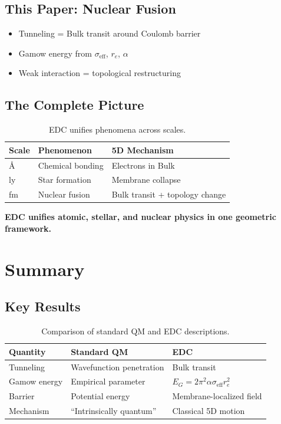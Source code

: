 \documentclass[12pt,a4paper]{article}
\begin{document}
\subsection{This Paper: Nuclear Fusion}
\begin{itemize}
    \item Tunneling = Bulk transit around Coulomb barrier
    \item Gamow energy from $\sigma_{\text{eff}}$, $r_e$, $\alpha$
    \item Weak interaction = topological restructuring
\end{itemize}

\subsection{The Complete Picture}

\begin{table}[H]
\centering
\begin{tabular}{@{}lll@{}}
\toprule
\textbf{Scale} & \textbf{Phenomenon} & \textbf{5D Mechanism} \\
\midrule
Å & Chemical bonding & Electrons in Bulk \\
ly & Star formation & Membrane collapse \\
fm & Nuclear fusion & Bulk transit + topology change \\
\bottomrule
\end{tabular}
\caption{EDC unifies phenomena across scales.}
\end{table}

\begin{keyresult}
\textbf{EDC unifies atomic, stellar, and nuclear physics in one geometric framework.}
\end{keyresult}

\section{Summary}

\subsection{Key Results}

\begin{table}[H]
\centering
\begin{tabular}{@{}lll@{}}
\toprule
\textbf{Quantity} & \textbf{Standard QM} & \textbf{EDC} \\
\midrule
Tunneling & Wavefunction penetration & Bulk transit \\
Gamow energy & Empirical parameter & $E_G = 2\pi^2\alpha\sigma_{\text{eff}}r_e^2$ \\
Barrier & Potential energy & Membrane-localized field \\
Mechanism & ``Intrinsically quantum'' & Classical 5D motion \\
\bottomrule
\end{tabular}
\caption{Comparison of standard QM and EDC descriptions.}
\end{table}
\end{document}
